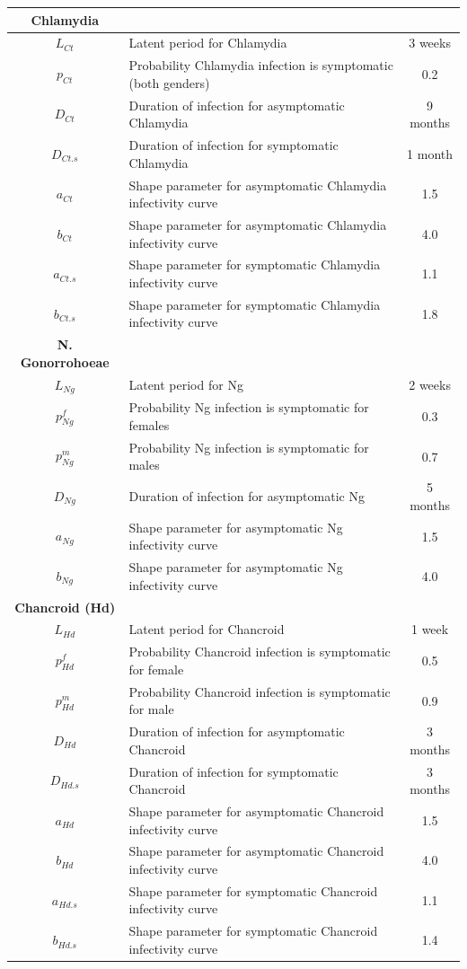 \documentclass[11pt, onecolumn]{article}
\begin{document}
\begin{table}[htdp]
\begin{scriptsize}
\begin{center}
\begin{tabular}{|clc|}
\hline
\textbf{Chlamydia} & & \\
\hline
$L_{Ct}$ & Latent period for Chlamydia & 3 weeks\\
$p_{Ct}$ & Probability Chlamydia infection is symptomatic (both genders) & 0.2\\
$D_{Ct}$ & Duration of infection for asymptomatic Chlamydia & 9 months\\
$D_{Ct.s}$ & Duration of infection for symptomatic Chlamydia & 1 month\\
$a_{Ct}$ & Shape parameter for asymptomatic Chlamydia infectivity curve& 1.5 \\
$b_{Ct}$ & Shape parameter for asymptomatic Chlamydia infectivity curve & 4.0 \\
$a_{Ct.s}$ & Shape parameter for symptomatic Chlamydia infectivity curve & 1.1 \\
$b_{Ct.s}$ & Shape parameter for symptomatic Chlamydia infectivity curve & 1.8 \\

\hline
\textbf{N. Gonorrohoeae} & & \\
\hline
$L_{Ng}$ & Latent period for Ng & 2 weeks\\
$p_{Ng}^f$ & Probability Ng infection is symptomatic for females & 0.3\\
$p_{Ng}^m$ & Probability Ng infection is symptomatic for males & 0.7\\
$D_{Ng}$ & Duration of infection for asymptomatic Ng & 5 months\\
$a_{Ng}$ & Shape parameter for asymptomatic Ng infectivity curve& 1.5 \\
$b_{Ng}$ & Shape parameter for asymptomatic Ng infectivity curve & 4.0 \\

\hline
\textbf{Chancroid (Hd)} & & \\
\hline
$L_{Hd}$ & Latent period for Chancroid & 1 week \\
$p_{Hd}^f$ & Probability Chancroid infection is symptomatic for female & 0.5 \\
$p_{Hd}^m$ & Probability Chancroid infection is symptomatic for male & 0.9 \\
$D_{Hd}$ & Duration of infection for asymptomatic Chancroid & 3 months \\
$D_{Hd.s}$ & Duration of infection for symptomatic Chancroid & 3 months \\
$a_{Hd}$ & Shape parameter for asymptomatic Chancroid infectivity curve& 1.5 \\
$b_{Hd}$ & Shape parameter for asymptomatic Chancroid infectivity curve & 4.0 \\
$a_{Hd.s}$ & Shape parameter for symptomatic Chancroid infectivity curve & 1.1 \\
$b_{Hd.s}$ & Shape parameter for symptomatic Chancroid infectivity curve & 1.4 \\


\end{tabular}
\end{center}
\end{scriptsize}
\end{table}
\end{document}
